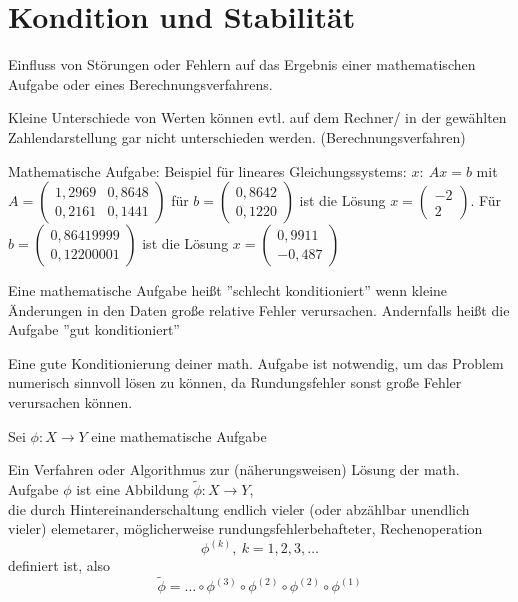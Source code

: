 \section{Kondition und Stabilität}
Einfluss von Störungen oder Fehlern auf das Ergebnis einer mathematischen Aufgabe oder eines Berechnungsverfahrens.\\
\begin{example} Kleine Unterschiede von Werten können evtl. auf dem Rechner/ in der gewählten Zahlendarstellung gar nicht unterschieden werden. (Berechnungsverfahren)
\end{example}
\begin{example}
    
Mathematische Aufgabe: Beispiel für lineares Gleichungssystems: $x:\ Ax=b$ mit $A= \begin{pmatrix}
1,2969 & 0,8648 \\
0,2161 & 0,1441 
\end{pmatrix}  $
für $b= \begin{pmatrix}
0,8642 \\
0,1220 
\end{pmatrix}  $ ist die Lösung $x= \begin{pmatrix}
-2 \\
2 
\end{pmatrix}  $.
Für $b= \begin{pmatrix}
0,86419999 \\
0,12200001 
\end{pmatrix}  $ ist die Lösung $x=\begin{pmatrix}
0,9911 \\
-0,487 
\end{pmatrix}  $
\end{example}
\begin{definition} Eine mathematische Aufgabe heißt ''schlecht konditioniert'' wenn kleine Änderungen in den Daten große relative Fehler verursachen.
Andernfalls heißt die Aufgabe ''gut konditioniert''
\end{definition}
\begin{remark}Eine gute Konditionierung deiner math. Aufgabe ist notwendig, um das Problem numerisch sinnvoll lösen zu können, da Rundungsfehler sonst große Fehler verursachen können.
\end{remark}
Sei $ \phi : X\to Y$ eine mathematische Aufgabe\\
\begin{definition}
    
Ein Verfahren oder  Algorithmus zur (näherungsweisen) Lösung der math. Aufgabe $\phi$ ist eine Abbildung $\tilde{\phi} :X\to Y$, \\
die durch Hintereinanderschaltung endlich vieler (oder abzählbar unendlich 
vieler) elemetarer, möglicherweise rundungsfehlerbehafteter, Rechenoperation 
$$\phi^{(k)},\ k= 1,2,3,\dots$$ definiert ist, also $$\tilde{\phi}=\dots \circ 
\phi^{(3)} \circ \phi^{(2)} \circ \phi^{(2)} \circ \phi^{(1)}$$
\end{definition}
